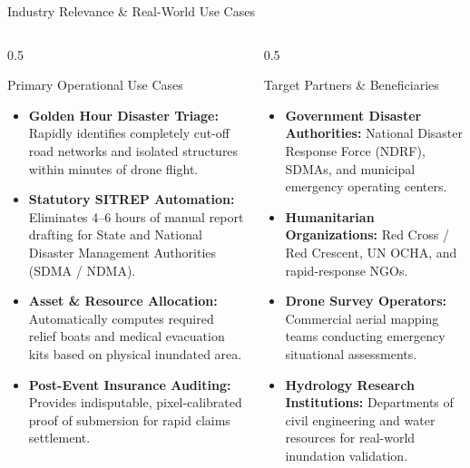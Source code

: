 \documentclass[aspectratio=169, 10pt, professionalfonts]{beamer}
\begin{document}
\begin{frame}{Industry Relevance \& Real-World Use Cases}
  \begin{columns}[T]
    \begin{column}{0.5\textwidth}
      \begin{block}{Primary Operational Use Cases}
        \begin{itemize}\setlength{\itemsep}{0.5em}\footnotesize
          \item \textbf{Golden Hour Disaster Triage:} Rapidly identifies completely cut-off road networks and isolated structures within minutes of drone flight.
          \item \textbf{Statutory SITREP Automation:} Eliminates 4--6 hours of manual report drafting for State and National Disaster Management Authorities (SDMA / NDMA).
          \item \textbf{Asset \& Resource Allocation:} Automatically computes required relief boats and medical evacuation kits based on physical inundated area.
          \item \textbf{Post-Event Insurance Auditing:} Provides indisputable, pixel-calibrated proof of submersion for rapid claims settlement.
        \end{itemize}
      \end{block}
    \end{column}
    
    \begin{column}{0.5\textwidth}
      \begin{block}{Target Partners \& Beneficiaries}
        \begin{itemize}\setlength{\itemsep}{0.5em}\footnotesize
          \item \textbf{Government Disaster Authorities:} National Disaster Response Force (NDRF), SDMAs, and municipal emergency operating centers.
          \item \textbf{Humanitarian Organizations:} Red Cross / Red Crescent, UN OCHA, and rapid-response NGOs.
          \item \textbf{Drone Survey Operators:} Commercial aerial mapping teams conducting emergency situational assessments.
          \item \textbf{Hydrology Research Institutions:} Departments of civil engineering and water resources for real-world inundation validation.
        \end{itemize}
      \end{block}
    \end{column}
  \end{columns}
\end{frame}
\end{document}

